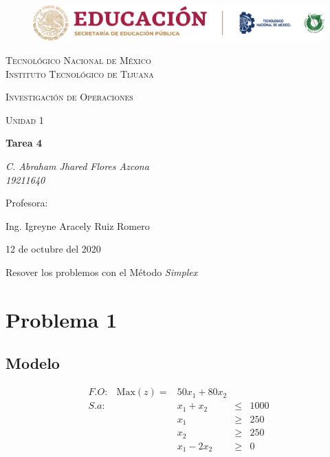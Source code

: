 \documentclass[letterpaper, 12pt]{article}
\begin{document}
    
    \begin{titlepage}
        \begin{figure}[ht]
            \centering
            \includegraphics[width=15cm]{logosITT.png}
        \end{figure}
        \centering
        {\scshape\LARGE Tecnológico Nacional de México\\Instituto Tecnológico de Tijuana\par}
        \vspace{1cm}
        {\scshape\Large Investigación de Operaciones\par}
        \vspace{1cm}
        {\scshape\Large Unidad 1\par}
        \vspace{1.5cm}
        {\huge\bfseries Tarea 4\par}
        \vspace{2cm}
        {\Large\itshape C. Abraham Jhared Flores Azcona\\19211640\par}
        \vfill
        Profesora: \par
        Ing. Igreyne Aracely Ruiz Romero
        
        \vfill

        {\large 12 de octubre del 2020}
    \end{titlepage}

    \setcounter{page}{1}
    \thispagestyle{fancy}
    Resover los problemos con el Método \emph{Simplex}
    \section{Problema 1}
    \subsection{Modelo}
    \[\begin{matrix}
        F.O\!:&\text{Max}(z)=&50x_1+80x_2&&\\
        S.a\!:&&x_1+x_2&\leq&1000\\
        &&x_1&\geq&250\\
        &&x_2&\geq&250\\
        &&x_1-2x_2&\geq&0
    \end{matrix}\]
\end{document}
